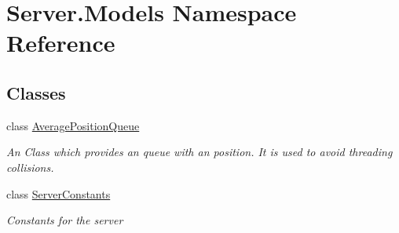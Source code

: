 \hypertarget{namespaceServer_1_1Models}{}\section{Server.\+Models Namespace Reference}
\label{namespaceServer_1_1Models}
\subsection*{Classes}
\begin{DoxyCompactItemize}
\item 
class \hyperlink{classServer_1_1Models_1_1AveragePositionQueue}{Average\+Position\+Queue}
\begin{DoxyCompactList}\small\item\em An Class which provides an queue with an position. It is used to avoid threading collisions. \end{DoxyCompactList}\item 
class \hyperlink{classServer_1_1Models_1_1ServerConstants}{Server\+Constants}
\begin{DoxyCompactList}\small\item\em Constants for the server \end{DoxyCompactList}\end{DoxyCompactItemize}
